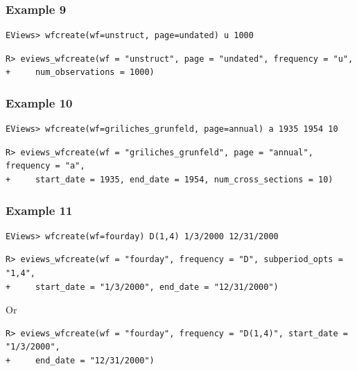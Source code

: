 \hypertarget{example-9-1}{%
\subsubsection{Example 9}\label{example-9-1}}

\begin{verbatim}
EViews> wfcreate(wf=unstruct, page=undated) u 1000
\end{verbatim}

\begin{verbatim}
R> eviews_wfcreate(wf = "unstruct", page = "undated", frequency = "u",
+     num_observations = 1000)
\end{verbatim}

\hypertarget{example-10-1}{%
\subsubsection{Example 10}\label{example-10-1}}

\begin{verbatim}
EViews> wfcreate(wf=griliches_grunfeld, page=annual) a 1935 1954 10
\end{verbatim}

\begin{verbatim}
R> eviews_wfcreate(wf = "griliches_grunfeld", page = "annual", frequency = "a",
+     start_date = 1935, end_date = 1954, num_cross_sections = 10)
\end{verbatim}

\hypertarget{example-11-1}{%
\subsubsection{Example 11}\label{example-11-1}}

\begin{verbatim}
EViews> wfcreate(wf=fourday) D(1,4) 1/3/2000 12/31/2000
\end{verbatim}

\begin{verbatim}
R> eviews_wfcreate(wf = "fourday", frequency = "D", subperiod_opts = "1,4",
+     start_date = "1/3/2000", end_date = "12/31/2000")
\end{verbatim}

Or

\begin{verbatim}
R> eviews_wfcreate(wf = "fourday", frequency = "D(1,4)", start_date = "1/3/2000",
+     end_date = "12/31/2000")
\end{verbatim}

